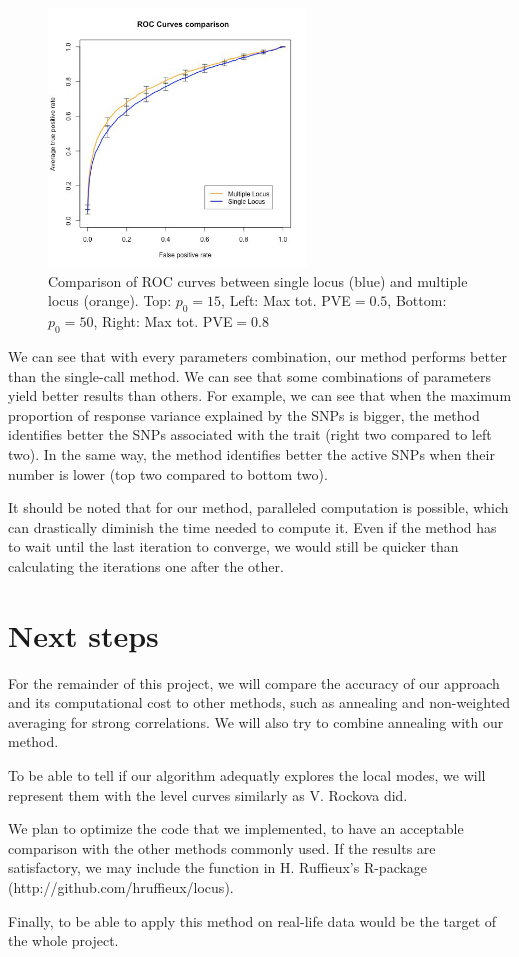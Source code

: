 \documentclass[a4paper, 11pt]{report}
\numberwithin{equation}{section}
\begin{document}
\begin{figure}[h!]
\includegraphics[width=2.7in, bb= 0 0 1.7in 1.7in]{images/ROC_Comp_p0_50_var_0_8.jpeg}
\caption{\label{fig:ROCComp}Comparison of ROC curves between single locus (blue) and multiple locus (orange). Top: $p_0 = 15$, Left: Max tot. PVE$ = 0.5$,
Bottom: $p_0 = 50$, Right: Max tot. PVE$ = 0.8$}
\end{figure}

We can see that with every parameters combination, our method performs better than the single-call method. We can see that some combinations of parameters yield better results than others. For example, we can see that when the maximum proportion of response variance explained by the SNPs is bigger, the method identifies better the SNPs associated with the trait (right two compared to left two). In the same way, the method identifies better the active SNPs when their number is lower (top two compared to bottom two).


It should be noted that for our method, paralleled computation is possible, which can drastically diminish the time needed to compute it. Even if the method has to wait until the last iteration to converge, we would still be quicker than calculating the iterations one after the other.
\newpage
\chapter{Next steps}
For the remainder of this project, we will compare the accuracy of our approach and its computational cost to other methods, such as annealing and non-weighted averaging for strong correlations. We will also try to combine annealing with our method.\cite{glob}

To be able to tell if our algorithm adequatly explores the local modes, we will represent them with the level curves similarly as V. Rockova \cite{rockova} did.

We plan to optimize the code that we implemented, to have an acceptable comparison with the other methods commonly used. If the results are satisfactory, we may include the function in H. Ruffieux's R-package (http://github.com/hruffieux/locus).

Finally, to be able to apply this method on real-life data would be the target of the whole project.
\newpage


\end{document}
